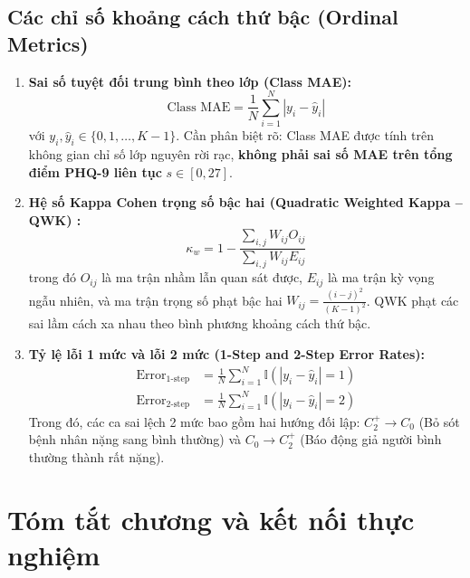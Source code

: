 \subsection{Các chỉ số khoảng cách thứ bậc (Ordinal Metrics)}
\begin{enumerate}
    \item \textbf{Sai số tuyệt đối trung bình theo lớp (Class MAE):}
    \begin{equation}
        \text{Class MAE} = \frac{1}{N} \sum_{i=1}^N |y_i - \hat{y}_i|
    \end{equation}
    với $y_i, \hat{y}_i \in \{0, 1, \dots, K-1\}$. Cần phân biệt rõ: Class MAE được tính trên không gian chỉ số lớp nguyên rời rạc, \textbf{không phải sai số MAE trên tổng điểm PHQ-9 liên tục} $s \in [0, 27]$.
    \item \textbf{Hệ số Kappa Cohen trọng số bậc hai (Quadratic Weighted Kappa -- QWK) \cite{cohen1968weighted}:}
    \begin{equation}
        \kappa_w = 1 - \frac{\sum_{i,j} W_{ij} O_{ij}}{\sum_{i,j} W_{ij} E_{ij}}
    \end{equation}
    trong đó $O_{ij}$ là ma trận nhầm lẫn quan sát được, $E_{ij}$ là ma trận kỳ vọng ngẫu nhiên, và ma trận trọng số phạt bậc hai $W_{ij} = \frac{(i - j)^2}{(K - 1)^2}$. QWK phạt các sai lầm cách xa nhau theo bình phương khoảng cách thứ bậc.
    \item \textbf{Tỷ lệ lỗi 1 mức và lỗi 2 mức (1-Step and 2-Step Error Rates):}
    \begin{align}
        \text{Error}_{\text{1-step}} &= \frac{1}{N} \sum_{i=1}^N \mathbb{I}(|y_i - \hat{y}_i| = 1) \\
        \text{Error}_{\text{2-step}} &= \frac{1}{N} \sum_{i=1}^N \mathbb{I}(|y_i - \hat{y}_i| = 2)
    \end{align}
    Trong đó, các ca sai lệch 2 mức bao gồm hai hướng đối lập: $C_2^+ \to C_0$ (Bỏ sót bệnh nhân nặng sang bình thường) và $C_0 \to C_2^+$ (Báo động giả người bình thường thành rất nặng).
\end{enumerate}

\section{Tóm tắt chương và kết nối thực nghiệm}
\label{sec:tom-tat-chuong-3}

